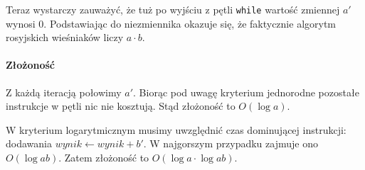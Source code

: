 Teraz wystarczy zauważyć, że tuż po wyjściu z pętli \texttt{while} wartość zmiennej $a'$ wynosi $0$.
Podstawiając do niezmiennika okazuje się, że faktycznie algorytm rosyjskich wieśniaków liczy $a \cdot b$.

\paragraph{Złożoność}

Z każdą iteracją połowimy $a'$. 
Biorąc pod uwagę kryterium jednorodne pozostałe instrukcje w pętli nic nie kosztują. 
Stąd złożoność to $O(\log a)$.

W kryterium logarytmicznym musimy uwzględnić czas dominującej instrukcji: dodawania  $wynik \leftarrow wynik + b'$. 
W najgorszym przypadku zajmuje ono $O(\log ab)$. Zatem złożoność to $O(\log a \cdot \log ab)$.

